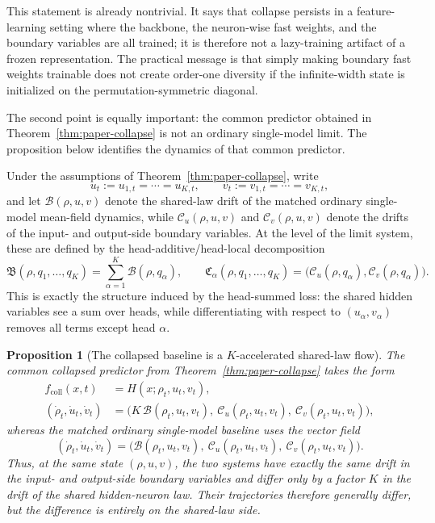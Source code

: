 \documentclass{article}
\newtheorem{proposition}[theorem]{Proposition}
\begin{document}
This statement is already nontrivial. It says that collapse persists in a feature-learning setting where the backbone, the neuron-wise fast weights, and the boundary variables are all trained; it is therefore not a lazy-training artifact of a frozen representation. The practical message is that simply making boundary fast weights trainable does not create order-one diversity if the infinite-width state is initialized on the permutation-symmetric diagonal.

The second point is equally important: the common predictor obtained in Theorem~\ref{thm:paper-collapse} is not an ordinary single-model limit. The proposition below identifies the dynamics of that common predictor.

Under the assumptions of Theorem~\ref{thm:paper-collapse}, write
\[
u_t:=u_{1,t}=\cdots=u_{K,t},
\qquad
v_t:=v_{1,t}=\cdots=v_{K,t},
\]
and let $\mathcal B(\rho,u,v)$ denote the shared-law drift of the matched ordinary single-model mean-field dynamics, while $\mathcal C_u(\rho,u,v)$ and $\mathcal C_v(\rho,u,v)$ denote the drifts of the input- and output-side boundary variables. At the level of the limit system, these are defined by the head-additive/head-local decomposition
\begin{equation}
\mathfrak B(\rho,q_1,\dots,q_K)
=
\sum_{\alpha=1}^K \mathcal B(\rho,q_\alpha),
\qquad
\mathfrak C_\alpha(\rho,q_1,\dots,q_K)
=
\bigl(\mathcal C_u(\rho,q_\alpha),\mathcal C_v(\rho,q_\alpha)\bigr).
\label{eq:paper-additive-local}
\end{equation}
This is exactly the structure induced by the head-summed loss: the shared hidden variables see a sum over heads, while differentiating with respect to $(u_\alpha,v_\alpha)$ removes all terms except head $\alpha$.

\begin{proposition}[The collapsed baseline is a $K$-accelerated shared-law flow]
\label{prop:paper-collapse-baseline}
The common collapsed predictor from Theorem~\ref{thm:paper-collapse} takes the form
\begin{align*}
f_{\mathrm{coll}}(x,t)&=H(x;\rho_t,u_t,v_t),\\
(\dot\rho_t,\dot u_t,\dot v_t)&=\bigl(K\,\mathcal B(\rho_t,u_t,v_t),\ \mathcal C_u(\rho_t,u_t,v_t),\ \mathcal C_v(\rho_t,u_t,v_t)\bigr),
\end{align*}
whereas the matched ordinary single-model baseline uses the vector field
\[
(\dot\rho_t,\dot u_t,\dot v_t)=\bigl(\mathcal B(\rho_t,u_t,v_t),\ \mathcal C_u(\rho_t,u_t,v_t),\ \mathcal C_v(\rho_t,u_t,v_t)\bigr).
\]
Thus, at the same state $(\rho,u,v)$, the two systems have exactly the same drift in the input- and output-side boundary variables and differ only by a factor $K$ in the drift of the shared hidden-neuron law. Their trajectories therefore generally differ, but the difference is entirely on the shared-law side.
\end{proposition}
\end{document}
